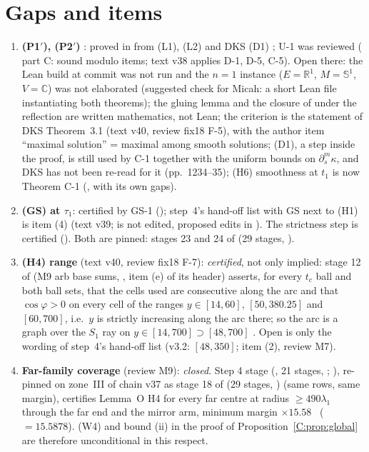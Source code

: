 \documentclass[11pt]{article}
\begin{document}
\section{Gaps and items}\label{C:sec:gaps}
\begin{enumerate}[leftmargin=*]
\item \textbf{(P1$'$), (P2$'$)} \tH: proved in  from (L1), (L2) \cite{CWFlow} and DKS (D1) \cite{DKS2002}; U-1 was reviewed ( part C: sound modulo items; text v38 applies D-1, D-5, C-5). Open there: the Lean build at commit  was not run and the $n=1$ instance ($E=\mathbb R^1$, $M=\mathbb S^1$, $V=\mathbb C$) was not elaborated (suggested check for Micah: a short Lean file instantiating both theorems); the gluing lemma and the closure of  under the reflection are written mathematics, not Lean; the criterion is the statement of DKS Theorem~3.1 (text v40, review fix18 F-5), with the author item ``maximal solution'' = maximal among smooth solutions; (D1), a step inside the proof, is still used by C-1 together with the uniform bounds on $\partial_s^m\kappa$, and DKS has not been re-read for it (pp.~1234--35); (H6) smoothness at $t_1$ is now Theorem C-1 (, with its own gaps).
\item \textbf{(GS) at $\tau_1$}: certified by GS-1 (); step~4's hand-off list with GS next to (H1) is  item (4) (text v39;  is not edited, proposed edits in ). The strictness step is certified (). Both are pinned: stages 23 and 24 of  (29 stages, ).
\item \textbf{(H4) range} (text v40, review fix18 F-7): \emph{certified}, not only implied: stage 12 of  (M9 arb base sums, , item (e) of its header) asserts, for every $t_c$ ball and both ball sets, that the cells used are consecutive along the arc and that $\cos\varphi>0$ on every cell of the ranges $y\in[14,60]$, $[50,380.25]$ and $[60,700]$, i.e.\ $y$ is strictly increasing along the arc there; so the arc is a graph over the $S_1$ ray on $y\in[14,700]\supset[48,700]$ \tC. Open is only the wording of step~4's hand-off list (v3.2: $[48,350]$;  item (2), review M7).
\item \textbf{Far-family coverage} (review M9): \emph{closed}. Step 4 stage  (, 21 stages, ; ), re-pinned on zone~III of chain v37 as stage 18 of  (29 stages, ) (same rows, same margin), certifies Lemma~O H4 for every far centre at radius $\ge490\lambda_1$ through the far end and the mirror arm, minimum margin $\times15.58$ \tC\ ($=15.5878$). (W4) and bound (ii) in the proof of Proposition~\ref{C:prop:global} are therefore unconditional in this respect.

\end{enumerate}
\end{document}
